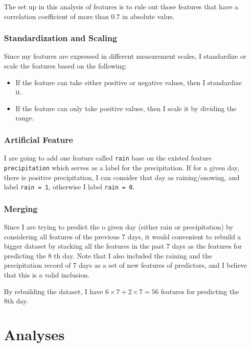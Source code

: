 \documentclass[a4paper,11pt]{article}
\newcommand{\pcode}[1]{\texttt{#1}}
\begin{document}
The set up in this analysis of features is to rule out those features that have a correlation coefficient of more than $0.7$ in absolute value.\par


\subsubsection{Standardization and Scaling}
Since my features are expressed in different measurement scales, I standardize or scale the features based on the following:
\begin{itemize}
\item If the feature can take either positive or negative values, then I standardize it.
\item If the feature can only take positive values, then I scale it by dividing the range.
\end{itemize}

\subsubsection{Artificial Feature}

I are going to add one feature called \pcode{rain} base on the existed feature \pcode{precipitation} which serves as a label for the precipitation. If for a given day, there is positive precipitation, I can consider that day as raining/snowing, and label \pcode{rain = 1}, otherwise I label \pcode{rain = 0}.

\subsubsection{Merging}
Since I are trying to predict the o given day (either rain or precipitation) by considering all features of the previous 7 days, it would convenient to rebuild a bigger dataset by  stacking all the features in the past 7 days as the features for predicting the 8 th day. Note that I also included the raining and the precipitation record of 7 days as a set of new features of predictors, and I believe that this is a valid inclusion.\par

By rebuilding the dataset, I have $6\times 7 + 2 \times 7 = 56$ features for predicting the 8th day.


\newpage

\section{Analyses}
\end{document}
